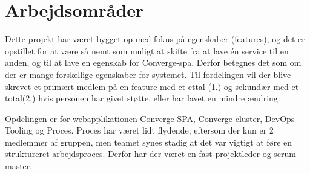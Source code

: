\section{Arbejdsområder}

Dette projekt har været bygget op med fokus på egenskaber (features), og det er opstillet for at være så nemt som muligt at skifte fra at lave én service til en anden, og til at lave en egenskab for Converge-spa. Derfor betegnes det som om der er mange forskellige egenskaber for systemet. Til fordelingen vil der blive skrevet et primært medlem på en feature med et ettal (1.) og sekundær med et total(2.) hvis personen har givet støtte, eller har lavet en mindre ændring.

Opdelingen er for webapplikationen Converge-SPA, Converge-cluster, DevOps \cite[DevOps]{converge-terms} Tooling og Proces. Proces har været lidt flydende, eftersom der kun er 2 medlemmer af gruppen, men teamet synes stadig at det var vigtigt at føre en struktureret arbejdsproces. Derfor har der været en fast projektleder og scrum master.


